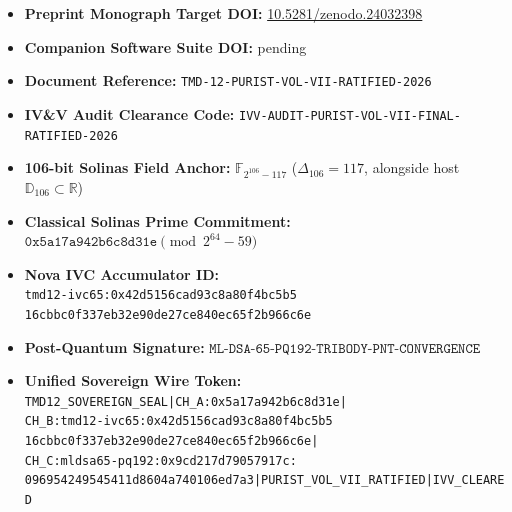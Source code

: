 \documentclass[11pt,a4paper,reqno]{article}
\theoremstyle{plain}
\theoremstyle{definition}
\theoremstyle{remark}
\numberwithin{equation}{section}
\numberwithin{table}{section}
\newcommand{\Ddd}{\mathbb{D}_{106}}
\begin{document}
\begin{itemize}
  \item \textbf{Preprint Monograph Target DOI:} \href{https://doi.org/10.5281/zenodo.24032398}{10.5281/zenodo.24032398}
  \item \textbf{Companion Software Suite DOI:} pending
  \item \textbf{Document Reference:} \texttt{TMD-12-PURIST-VOL-VII-RATIFIED-2026}
  \item \textbf{IV\&V Audit Clearance Code:} \texttt{IVV-AUDIT-PURIST-VOL-VII-FINAL-RATIFIED-2026}
  \item \textbf{106-bit Solinas Field Anchor:} $\mathbb{F}_{2^{106}-117}$ ($\Delta_{106} = 117$, alongside host $\Ddd \subset \mathbb{R}$)
  \item \textbf{Classical Solinas Prime Commitment:} $\mathtt{0x5a17a942b6c8d31e} \pmod{2^{64}-59}$
  \item \textbf{Nova IVC Accumulator ID:}\\
  \texttt{tmd12-ivc65:0x42d5156cad93c8a80f4bc5b5}\\
  \texttt{16cbbc0f337eb32e90de27ce840ec65f2b966c6e}
  \item \textbf{Post-Quantum Signature:} $\mathtt{ML\text{-}DSA\text{-}65\text{-}PQ192\text{-}TRIBODY\text{-}PNT\text{-}CONVERGENCE}$
  \item \textbf{Unified Sovereign Wire Token:}\\
  \texttt{TMD12\_SOVEREIGN\_SEAL|CH\_A:0x5a17a942b6c8d31e|}\\
  \texttt{CH\_B:tmd12-ivc65:0x42d5156cad93c8a80f4bc5b5}\\
  \texttt{16cbbc0f337eb32e90de27ce840ec65f2b966c6e|}\\
  \texttt{CH\_C:mldsa65-pq192:0x9cd217d79057917c:}\\
  \texttt{096954249545411d8604a740106ed7a3|PURIST\_VOL\_VII\_RATIFIED|IVV\_CLEARED}
\end{itemize}
\end{document}
